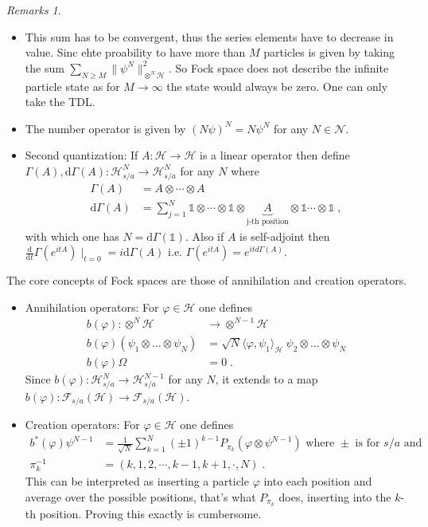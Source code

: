 \documentclass[
a4paper, %
11pt, %
onecolumn, %
openany, %
]{memoir}
\theoremstyle{definition}
\theoremstyle{remark}
\newtheorem{remarks}{Remarks}[chapter]
\theoremstyle{plain}
\begin{document}
\begin{remarks}
	\begin{itemize}
		\item This sum has to be convergent, thus the series elements have to decrease in value. Sinc ehte proability to have more than $M$ particles is given by taking the sum $\sum_{N\geq M}\|\psi^N\|^2_{\otimes^N\mathcal{H}}$. So Fock space does not describe the infinite particle state as for $M\rightarrow\infty$ the state would always be zero. One can only take the TDL.
		\item The number operator is given by $(N\psi)^N=N\psi^N$ for any $N\in \mathcal{N}$.
		\item Second quantization: If $A:\mathcal{H}\rightarrow \mathcal{H}$ is a linear operator then define $\Gamma(A),\mathrm{d}\Gamma(A):\mathcal{H}_{s/a}^N\rightarrow \mathcal{H}_{s/a}^N$ for any $N$ where \begin{align}
		\Gamma(A)&=A\otimes \cdots \otimes A\\
		\mathrm{d}\Gamma(A)&=\sum_{j=1}^N\mathds{1}\otimes\cdots\otimes \mathds{1}\otimes \underbrace{A}_{\text{j-th position}}\otimes \mathds{1}\cdots \otimes \mathds{1}\;,
		\end{align}
		with which one has $N=\mathrm{d}\Gamma(\mathds{1})$. Also if $A$ is self-adjoint then $\frac{\mathrm{d}}{\mathrm{d}t}\Gamma(e^{itA})\mid_{t=0}=i\mathrm{d}\Gamma(A)$ i.e. $\Gamma(e^{itA})=e^{itd\Gamma(A)}$.
	\end{itemize}
\end{remarks}
The core concepts of Fock spaces are those of annihilation and creation operators. \begin{itemize}
	\item Annihilation operators: For $\varphi\in\mathcal{H}$ one defines \begin{align}
	b(\varphi):\otimes^N\mathcal{H}&\longrightarrow \otimes^{N-1}\mathcal{H}\\
	b(\varphi)(\psi_1\otimes\ldots\otimes\psi_N)&=\sqrt{N}\langle \varphi,\psi_1\rangle_{\mathcal{H}}~\psi_2\otimes\ldots\otimes\psi_N\\
	b(\varphi)\Omega &= 0\; .
	\end{align}
	Since $b(\varphi):\mathcal{H}_{s/a}^N\rightarrow \mathcal{H}_{s/a}^{N-1}$ for any $N$, it extends to a map $b(\varphi):\mathcal{F}_{s/a}(\mathcal{H})\rightarrow \mathcal{F}_{s/a}(\mathcal{H})$.
	\item Creation operators: For $\varphi\in\mathcal{H}$ one defines \begin{align}
	b^*(\varphi)\psi^{N-1}&=\frac{1}{\sqrt{N}}\sum_{k=1}^{N}(\pm 1)^{k-1}P_{\pi_k}(\varphi\otimes \psi^{N-1}) \text{ where $\pm$ is for $s/a$ and}\\
	\pi_k^{-1}&=(k,1,2,\cdots,k-1,k+1,\cdot,N)\; .
	\end{align}
	This can be interpreted as inserting a particle $\varphi$ into each position and average over the possible positions, that's what $P_{\pi_k}$ does, inserting into the $k$-th position. Proving this exactly is cumbersome.
	\end{itemize}
\end{document}
